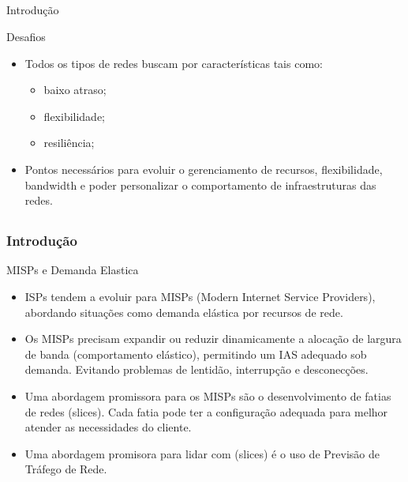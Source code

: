 \documentclass[aspectratio=169]{beamer}
\begin{document}
\subsection{}
\begin{frame}{Introdução}
    \begin{block}{Desafios}
\begin{itemize}
    \item Todos os tipos de redes buscam por características tais como:
    \begin{itemize}
        \item baixo atraso;
        \item flexibilidade;
        \item resiliência;
    \end{itemize}
    \item Pontos necessários para evoluir o gerenciamento de recursos, flexibilidade, bandwidth e poder personalizar o comportamento de infraestruturas das redes.
\end{itemize}
\end{block}
\end{frame}

\subsection{}
\begin{frame}
\frametitle{Introdução}
\begin{block}{MISPs e Demanda Elastica}
    \begin{itemize}
    \item ISPs tendem a evoluir para MISPs (Modern Internet Service Providers), abordando situações como demanda elástica por recursos de rede. 
    \item Os MISPs precisam expandir ou reduzir dinamicamente a alocação de largura de banda (comportamento elástico), permitindo um IAS adequado sob demanda. Evitando problemas de lentidão, interrupção e desconecções. 
    \item Uma abordagem promissora para os MISPs são o desenvolvimento de fatias de redes (slices). Cada fatia pode ter a configuração adequada para melhor atender as necessidades do cliente.
    \item Uma abordagem promisora para lidar com (slices) é o uso de Previsão de Tráfego de Rede.
    \end{itemize}
\end{block}
\end{frame}
\end{document}
